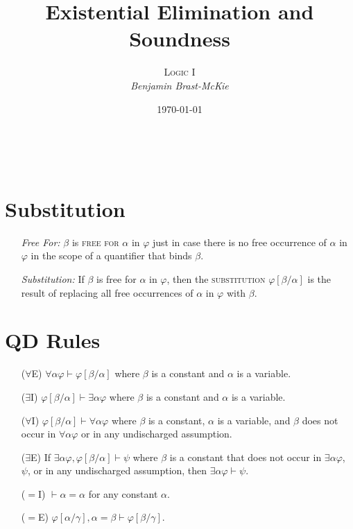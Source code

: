 \documentclass[a4paper, 11pt]{article} %
\title{\textbf{Existential Elimination and Soundness}} %
\author{\textsc{Logic I}\\ \em Benjamin Brast-McKie} %
\date{\today} %
\makeatletter
\newcommand{\unisub}[2]{[#1/#2]}
\renewcommand{\maketitle}{ %
\begin{flushright} %
{\LARGE\@title} %

\vspace{10pt} %

{\@author} %
\\\@date %

\vspace{0pt} %
\end{flushright}
}
\makeatother
\begin{document}
\maketitle %

\thispagestyle{empty}



\section*{Substitution}

\begin{enumerate}
  \item[\it Free For:] $\beta$ is \textsc{free for} $\alpha$ in $\varphi$ just in case there is no free occurrence of $\alpha$ in $\varphi$ in the scope of a quantifier that binds $\beta$. 
  \item[\it Substitution:] If $\beta$ is free for $\alpha$ in $\varphi$, then the \textsc{substitution} $\varphi\unisub{\beta}{\alpha}$ is the result of replacing all free occurrences of $\alpha$ in $\varphi$ with $\beta$.
\end{enumerate}
   






\section*{QD Rules}

\begin{enumerate}
  \item[($\forall$E)] $\forall\alpha\varphi \vdash \varphi\unisub{\beta}{\alpha}$ where $\beta$ is a constant and $\alpha$ is a variable. 
  \item[($\exists$I)] $\varphi\unisub{\beta}{\alpha} \vdash \exists\alpha\varphi$ where $\beta$ is a constant and $\alpha$ is a variable.
  \item[($\forall$I)] $\varphi\unisub{\beta}{\alpha} \vdash \forall\alpha\varphi$ where $\beta$ is a constant, $\alpha$ is a variable, and $\beta$ does not occur in $\forall\alpha\varphi$ or in any undischarged assumption.
  \item[($\exists$E)] If $\exists\alpha\varphi,\varphi\unisub{\beta}{\alpha} \vdash \psi$ where $\beta$ is a constant that does not occur in $\exists\alpha\varphi$, $\psi$, or in any undischarged assumption, then $\exists\alpha\varphi\vdash \psi$.
  \item[($=$I)] $\vdash \alpha = \alpha$ for any constant $\alpha$. 
  \item[($=$E)] $\varphi\unisub{\alpha}{\gamma},\alpha=\beta\vdash\varphi\unisub{\beta}{\gamma}$.
\end{enumerate}
\end{document}
